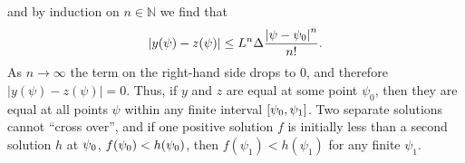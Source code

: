 %
and by induction on $n\in\mathbb{N}$ we find that 
%
\begin{equation}
  \left|y(\psi)-z(\psi)\right| 
  \le
  L^n\Delta\frac{\left|\psi-\psi_0\right|^n}{n!}.
\end{equation}
%
As $n\to\infty$ the term on the right-hand side drops to $0$, and therefore $|y(\psi)-z(\psi)|=0$. Thus, if $y$ and $z$ are equal at some point $\psi_0$, then they are equal at all points $\psi$ within any finite interval $[\psi_0,\psi_1]$. Two separate solutions cannot ``cross over'', and if one positive solution $f$ is initially less than a second solution $h$ at $\psi_0$, $f(\psi_0)<h(\psi_0)$, then $f(\psi_1)<h(\psi_1)$ for any finite $\psi_1$.  

